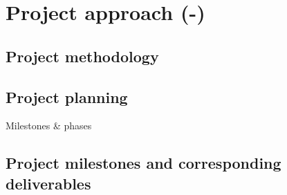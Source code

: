 \section{Project approach (-)}
\label{sec:project-approach}
\subsection{Project methodology}
\lipsum[1]

\subsection{Project planning}
Milestones \& phases

\subsection{Project milestones and corresponding deliverables }
\lipsum[1]

